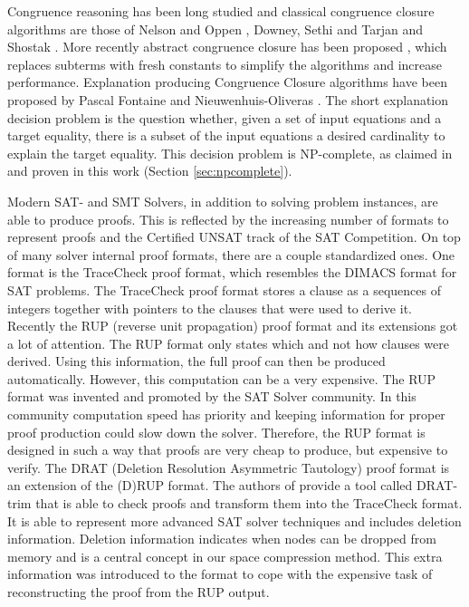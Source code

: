 Congruence reasoning has been long studied and classical congruence closure algorithms are those of Nelson and Oppen \cite{Nelson1980}, Downey, Sethi and Tarjan \cite{Downey1980} and Shostak \cite{Shostak1978}.
More recently abstract congruence closure has been proposed \cite{Bachmair2000}, which replaces subterms with fresh constants to simplify the algorithms and increase performance.
Explanation producing Congruence Closure algorithms have been proposed by Pascal Fontaine \cite{Fontaine2004} and Nieuwenhuis-Oliveras \cite{Nieuwenhuis2007,Nieuwenhuis2005}.
The short explanation decision problem is the question whether, given a set of input equations and a target equality, there is a subset of the input equations a desired cardinality to explain the target equality.
This decision problem is NP-complete, as claimed in \cite{Nieuwenhuis2005,Nieuwenhuis2007} and proven in this work (Section \ref{sec:npcomplete}).

Modern SAT- and SMT Solvers, in addition to solving problem instances, are able to produce proofs.
This is reflected by the increasing number of formats to represent proofs and the Certified UNSAT track of the SAT Competition.
On top of many solver internal proof formats, there are a couple standardized ones.
One format is the TraceCheck proof format, which resembles the DIMACS format for SAT problems.
The TraceCheck proof format stores a clause as a sequences of integers together with pointers to the clauses that were used to derive it.
Recently the RUP (reverse unit propagation) proof format and its extensions got a lot of attention.
The RUP format only states which and not how clauses were derived.
Using this information, the full proof can then be produced automatically.
However, this computation can be a very expensive.
The RUP format was invented and promoted by the SAT Solver community.
In this community computation speed has priority and keeping information for proper proof production could slow down the solver.
Therefore, the RUP format is designed in such a way that proofs are very cheap to produce, but expensive to verify.
The DRAT (Deletion Resolution Asymmetric Tautology) proof format \cite{Wetzler2014} is an extension of the (D)RUP format.
The authors of \cite{Wetzler2014} provide a tool called DRAT-trim that is able to check proofs and transform them into the TraceCheck format.
It is able to represent more advanced SAT solver techniques and includes deletion information.
Deletion information indicates when nodes can be dropped from memory and is a central concept in our space compression method.
This extra information was introduced to the format to cope with the expensive task of reconstructing the proof from the RUP output.


